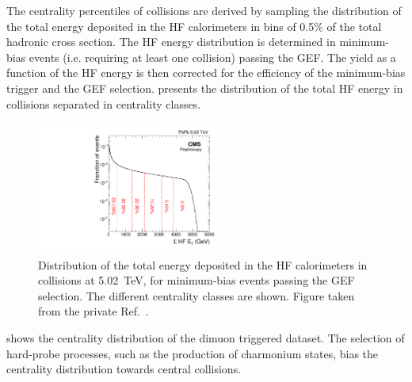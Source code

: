 The centrality percentiles of \RunPbPb collisions are derived by sampling the distribution of the total energy deposited in the HF calorimeters in bins of 0.5\% of the total hadronic cross section. The HF energy distribution is determined in minimum-bias events (i.e. requiring at least one collision) passing the GEF. The yield as a function of the HF energy is then corrected for the efficiency of the minimum-bias trigger and the GEF selection.  presents the distribution of the total HF energy in \RunPbPb collisions separated in centrality classes.

\begin{figure}[htb!]
 \centering
 \includegraphics[width=0.55\textwidth]{Figures/Charmonia/Analysis/EventSelection/EHF.pdf}
 \caption{Distribution of the total energy deposited in the HF calorimeters in \RunPbPb collisions at \SI{5.02}{\TeV}, for minimum-bias events passing the GEF selection. The different centrality classes are shown. Figure taken from the private Ref.~\cite{Centrality_PbPb}.}
 \label{fig:energyHF}
\end{figure}

 shows the centrality distribution of the dimuon triggered \RunPbPb dataset. The selection of hard-probe processes, such as the production of charmonium states, bias the centrality distribution towards central collisions. 

